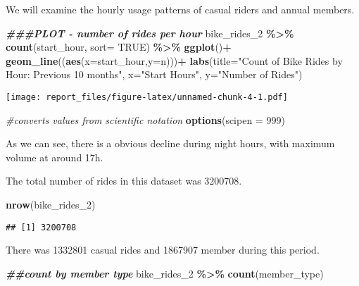 \documentclass[
]{article}
\newenvironment{Shaded}{\begin{snugshade}}{\end{snugshade}}
\newcommand{\AttributeTok}[1]{\textcolor[rgb]{0.13,0.29,0.53}{#1}}
\newcommand{\CommentTok}[1]{\textcolor[rgb]{0.56,0.35,0.01}{\textit{#1}}}
\newcommand{\ConstantTok}[1]{\textcolor[rgb]{0.56,0.35,0.01}{#1}}
\newcommand{\DecValTok}[1]{\textcolor[rgb]{0.00,0.00,0.81}{#1}}
\newcommand{\DocumentationTok}[1]{\textcolor[rgb]{0.56,0.35,0.01}{\textbf{\textit{#1}}}}
\newcommand{\FunctionTok}[1]{\textcolor[rgb]{0.13,0.29,0.53}{\textbf{#1}}}
\newcommand{\NormalTok}[1]{#1}
\newcommand{\SpecialCharTok}[1]{\textcolor[rgb]{0.81,0.36,0.00}{\textbf{#1}}}
\newcommand{\StringTok}[1]{\textcolor[rgb]{0.31,0.60,0.02}{#1}}
\begin{document}
We will examine the hourly usage patterns of casual riders and annual
members.

\begin{Shaded}
\begin{Highlighting}[]
\DocumentationTok{\#\#\#PLOT {-} number of rides per hour}
\NormalTok{bike\_rides\_2 }\SpecialCharTok{\%\textgreater{}\%} \FunctionTok{count}\NormalTok{(start\_hour, }\AttributeTok{sort=} \ConstantTok{TRUE}\NormalTok{) }\SpecialCharTok{\%\textgreater{}\%}
  \FunctionTok{ggplot}\NormalTok{()}\SpecialCharTok{+}
  \FunctionTok{geom\_line}\NormalTok{((}\FunctionTok{aes}\NormalTok{(}\AttributeTok{x=}\NormalTok{start\_hour,}\AttributeTok{y=}\NormalTok{n)))}\SpecialCharTok{+}
  \FunctionTok{labs}\NormalTok{(}\AttributeTok{title=}\StringTok{"Count of Bike Rides by Hour: Previous 10 months"}\NormalTok{, }\AttributeTok{x=}\StringTok{"Start Hours"}\NormalTok{, }\AttributeTok{y=}\StringTok{"Number of Rides"}\NormalTok{)}
\end{Highlighting}
\end{Shaded}

\texttt{[image: report\_files/figure-latex/unnamed-chunk-4-1.pdf]}

\begin{Shaded}
\begin{Highlighting}[]
\CommentTok{\#converts values from scientific notation }
\FunctionTok{options}\NormalTok{(}\AttributeTok{scipen =} \DecValTok{999}\NormalTok{)}
\end{Highlighting}
\end{Shaded}

As we can see, there is a obvious decline during night hours, with
maximum volume at around 17h.

The total number of rides in this dataset was 3200708.

\begin{Shaded}
\begin{Highlighting}[]
\FunctionTok{nrow}\NormalTok{(bike\_rides\_2)}
\end{Highlighting}
\end{Shaded}

\begin{verbatim}
## [1] 3200708
\end{verbatim}

There was 1332801 casual rides and 1867907 member during this period.

\begin{Shaded}
\begin{Highlighting}[]
\DocumentationTok{\#\#count by member type}
\NormalTok{bike\_rides\_2 }\SpecialCharTok{\%\textgreater{}\%} \FunctionTok{count}\NormalTok{(member\_type)}
\end{Highlighting}
\end{Shaded}
\end{document}
